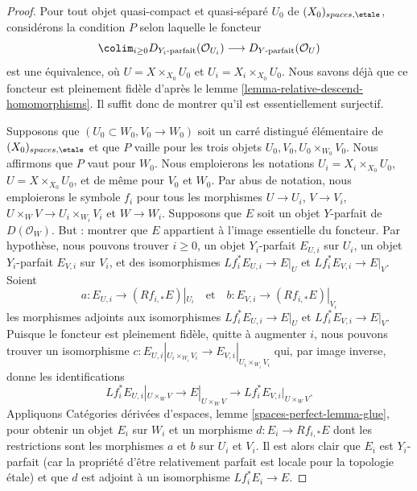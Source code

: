 \begin{proof}
Pour tout objet quasi-compact et quasi-séparé $U_0$ de
$(X_0)_{spaces, \etale}$, considérons la condition $P$
selon laquelle le foncteur
$$
\colim_{i \geq 0} D_{Y_i\text{-parfait}}(\mathcal{O}_{U_i})
\longrightarrow
D_{Y\text{-parfait}}(\mathcal{O}_U)
$$
est une équivalence, où $U = X \times_{X_0} U_0$ et
$U_i = X_i \times_{X_0} U_0$.
Nous savons déjà que ce foncteur est pleinement fidèle
d'après le lemme \ref{lemma-relative-descend-homomorphisms}. Il suffit donc de montrer
qu'il est essentiellement surjectif.

\medskip\noindent
Supposons que $(U_0 \subset W_0, V_0 \to W_0)$ soit un carré
distingué élémentaire de $(X_0)_{spaces, \etale}$
et que $P$ vaille pour les trois objets $U_0, V_0, U_0 \times_{W_0} V_0$.
Nous affirmons que $P$ vaut pour $W_0$. Nous emploierons les notations
$U_i = X_i \times_{X_0} U_0$, $U = X \times_{X_0} U_0$,
et de même pour $V_0$ et $W_0$. Par abus de notation, nous emploierons le symbole
$f_i$ pour tous les morphismes $U \to U_i$, $V \to V_i$,
$U \times_W V \to U_i \times_{W_i} V_i$ et $W \to W_i$.
Supposons que $E$ soit un objet $Y$-parfait de $D(\mathcal{O}_W)$.
But : montrer que $E$ appartient à l'image essentielle du foncteur.
Par hypothèse,
nous pouvons trouver $i \geq 0$, un objet $Y_i$-parfait $E_{U, i}$ sur $U_i$,
un objet $Y_i$-parfait $E_{V, i}$ sur $V_i$, et
des isomorphismes $Lf_i^*E_{U, i} \to E|_U$ et $Lf_i^*E_{V, i} \to E|_V$.
Soient
$$
a : E_{U, i} \to (Rf_{i, *}E)|_{U_i}
\quad\text{et}\quad
b : E_{V, i} \to (Rf_{i, *}E)|_{V_i}
$$
les morphismes adjoints aux isomorphismes $Lf_i^*E_{U, i} \to E|_U$
et $Lf_i^*E_{V, i} \to E|_V$.
Puisque le foncteur est pleinement fidèle, quitte à augmenter $i$,
nous pouvons trouver un isomorphisme
$c : E_{U, i}|_{U_i \times_{W_i} V_i} \to E_{V, i}|_{U_i \times_{W_i} V_i}$
qui, par image inverse, donne les identifications
$$
Lf_i^*E_{U, i}|_{U \times_W V} \to E|_{U \times_W V} \to
Lf_i^*E_{V, i}|_{U \times_W V}.
$$
Appliquons Catégories dérivées d'espaces, lemme
\ref{spaces-perfect-lemma-glue},
pour obtenir un objet $E_i$ sur $W_i$ et un morphisme $d : E_i \to Rf_{i, *}E$
dont les restrictions sont les morphismes $a$ et $b$ sur $U_i$ et $V_i$.
Il est alors clair que $E_i$ est $Y_i$-parfait (car la propriété d'être
relativement parfait est locale pour la topologie \'etale) et que
$d$ est adjoint à un isomorphisme $Lf_i^*E_i \to E$.


\end{proof}
